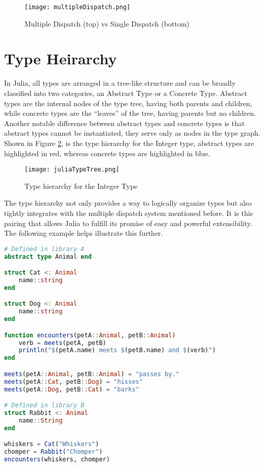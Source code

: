 \begin{figure}[!h]
    \texttt{[image: multipleDispatch.png]}
    \centering
    \caption{Multiple Dispatch (top) vs Single Dispatch (bottom)} 
    \label{fig:multipleDispatch}
\end{figure}

\section{Type Heirarchy}
In Julia, all types are arranged in a tree-like structure and can be broadly classified into two categories, an Abstract
Type or a Concrete Type. Abstract types are the internal nodes of the type tree, having both parents and children, while
concrete types are the ``leaves'' of the tree, having parents but no children. Another notable difference between
abstract types and concrete types is that abstract types cannot be instantiated, they serve only as nodes in the type
graph. Shown in Figure \ref{fig:juliaTypeHeirarchy}, is the type hierarchy for the Integer type, abstract types are
highlighted in red, whereas concrete types are highlighted in blue. \hfill
\begin{figure}[t]
    \texttt{[image: juliaTypeTree.png]}
    \centering
    \caption{Type hierarchy for the Integer Type} 
    \label{fig:juliaTypeHeirarchy}
\end{figure}
\FloatBarrier
The type hierarchy not only provides a way to logically organize types but also tightly integrates with the multiple
dispatch system mentioned before. It is this pairing that allows Julia to fulfill its promise of easy and powerful
extensibility. The following example helps illustrate this further.
\begin{lstlisting}[language=Julia]
# Defined in library A
abstract type Animal end

struct Cat <: Animal
    name::string
end

struct Dog <: Animal
    name::string
end

function encounters(petA::Animal, petB::Animal)
    verb = meets(petA, petB)
    println("$(petA.name) meets $(petB.name) and $(verb)")
end

meets(petA::Animal, petB::Animal) = "passes by."
meets(petA::Cat, petB::Dog) = "hisses"
meets(petA::Dog, petB::Cat) = "barks"

# Defined in library B
struct Rabbit <: Animal
    name::String
end

whiskers = Cat("Whiskers")
chomper = Rabbit("Chomper")
encounters(whiskers, chomper)
\end{lstlisting}
